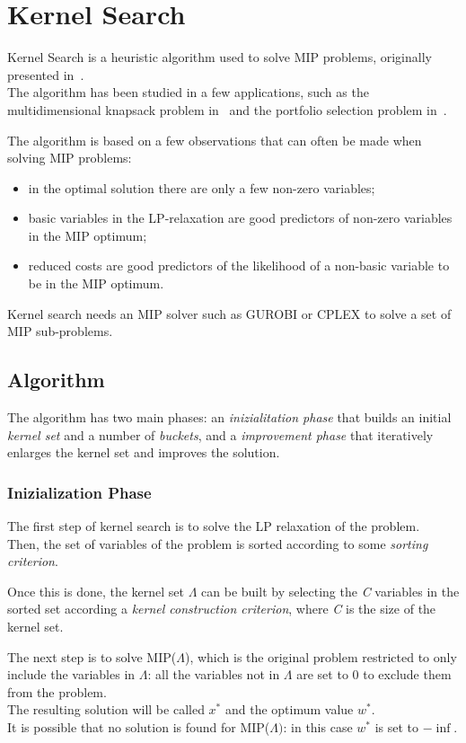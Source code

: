 \chapter{Kernel Search}

Kernel Search is a heuristic algorithm used to solve MIP problems, originally presented in~\cite{kernel:2007}.\\
The algorithm has been studied in a few applications, such as the multidimensional knapsack problem
in~\cite{kernel:2010} and the portfolio selection problem in~\cite{kernel:2012}.

The algorithm is based on a few observations that can often be made when solving MIP problems:
\begin{itemize}
    \item in the optimal solution there are only a few non-zero variables;
    \item basic variables in the LP-relaxation are good predictors of non-zero variables in the MIP optimum;
    \item reduced costs are good predictors of the likelihood of a non-basic variable to be in the MIP optimum.
\end{itemize}

Kernel search needs an MIP solver such as GUROBI or CPLEX to solve a set of MIP sub-problems.


\section{Algorithm}
The algorithm has two main phases: an \textit{inizialitation phase}
that builds an initial \textit{kernel set} and a number of \textit{buckets},
and a \textit{improvement phase} that iteratively enlarges the kernel set and improves the solution.

\subsection{Inizialization Phase}
The first step of kernel search is to solve the LP relaxation of the problem.\\
Then, the set of variables of the problem is sorted according to some \textit{sorting criterion}.

Once this is done, the kernel set \(\Lambda\) can be built by selecting the \textit{C}
variables in the sorted set according a \textit{kernel construction criterion},
where \textit{C} is the size of the kernel set.

The next step is to solve MIP(\(\Lambda\)),
which is the original problem restricted to only include the variables in \(\Lambda\):
all the variables not in \(\Lambda\) are set to 0 to exclude them from the problem.\\
The resulting solution will be called \(x^{*}\) and the optimum value \(w^{*}\).\\
It is possible that no solution is found for MIP(\(\Lambda)\): in this case \(w^{*}\) is set to \(-\inf\).

